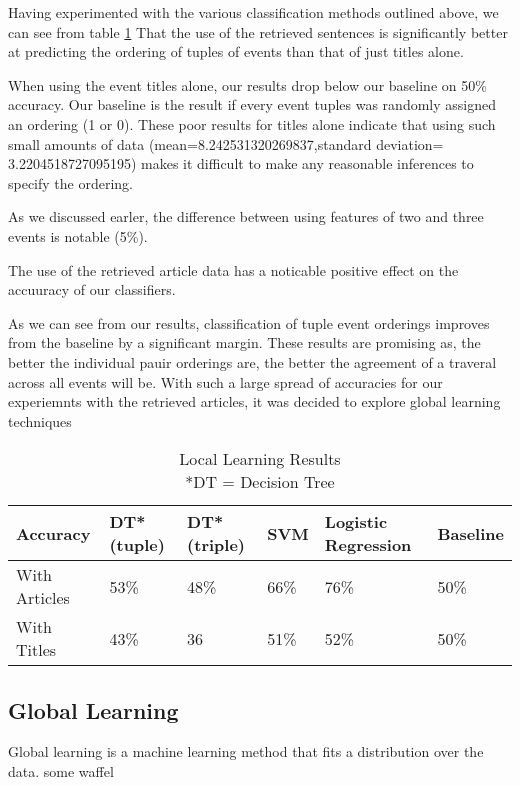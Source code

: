 \documentclass[bsc,frontabs,twoside,singlespacing,parskip,deptreport]{infthesis}     %
\begin{document}
Having experimented with the various classification methods outlined above, we can see from table \ref{table:local-learning}
That the use of the retrieved sentences is significantly better at predicting the ordering of tuples of events than that of
just titles alone.

When using the event titles alone, our results drop below our baseline on 50\% accuracy.
Our baseline is the result if every event tuples was randomly assigned an ordering (1 or 0).
These poor results for titles alone indicate that using such small amounts of data
(mean=8.242531320269837,standard deviation= 3.2204518727095195) makes it difficult to make any reasonable inferences to specify the ordering.


As we discussed earler, the difference between using features of two and three events is notable (5\%).

The use of the retrieved article data has a noticable positive effect on the accuuracy of our classifiers.



As we can see from our results, classification of tuple event orderings improves from the baseline by a significant margin.
These results are promising as, the better the individual pauir orderings are, the better the agreement of a traveral across all events will be.
With such a large spread of accuracies for our experiemnts with the retrieved articles, it was decided to explore global learning techniques

\begin{table}[H]
\centering
\label{table:local-learning}
\begin{tabular}{|p{5em}|l|l|l|p{4em}|l|}
  \hline
  Accuracy  & DT* (tuple) & DT* (triple) & SVM & Logistic Regression & Baseline\\
  \hline
  With Articles    & 53\%  & 48\%    & 66\% &  76\% & 50\%\\
\hline
With Titles & 43\%  & 36& 51\%    & 52\% & 50\%\\
\hline
\end{tabular}
\caption{Local Learning Results  \\*DT = Decision Tree }
\end{table}


\subsection{Global Learning}
Global learning is a machine learning method that fits a distribution over the data.
some waffel \cite{huang2008machine}
\end{document}
